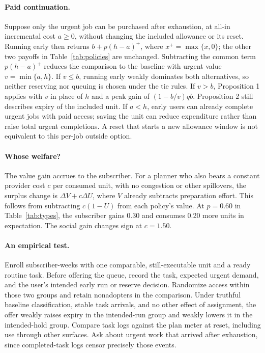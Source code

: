 \documentclass[11pt]{article}
\begin{document}
\paragraph{Paid continuation.}
Suppose only the urgent job can be purchased after exhaustion, at all-in incremental cost $a\geq0$, without changing the included allowance or its reset. Running early then returns $b+p(h-a)^+$, where $x^+=\max\{x,0\}$; the other two payoffs in Table~\ref{tab:policies} are unchanged. Subtracting the common term $p(h-a)^+$ reduces the comparison to the baseline with urgent value $v=\min\{a,h\}$. If $v\leq b$, running early weakly dominates both alternatives, so neither reserving nor queuing is chosen under the tie rules. If $v>b$, Proposition 1 applies with $v$ in place of $h$ and a peak gain of $(1-b/v)qb$. Proposition 2 still describes expiry of the included unit. If $a<h$, early users can already complete urgent jobs with paid access; saving the unit can reduce expenditure rather than raise total urgent completions. A reset that starts a new allowance window is not equivalent to this per-job outside option.

\paragraph{Whose welfare?}
The value gain accrues to the subscriber. For a planner who also bears a constant provider cost $c$ per consumed unit, with no congestion or other spillovers, the surplus change is $\Delta V+c\Delta U$, where $V$ already subtracts preparation effort. This follows from subtracting $c(1-U)$ from each policy's value. At $p=0.60$ in Table~\ref{tab:types}, the subscriber gains 0.30 and consumes 0.20 more units in expectation. The social gain changes sign at $c=1.50$.

\paragraph{An empirical test.}
Enroll subscriber-weeks with one comparable, still-executable unit and a ready routine task. Before offering the queue, record the task, expected urgent demand, and the user's intended early run or reserve decision. Randomize access within those two groups and retain nonadopters in the comparison. Under truthful baseline classification, stable task arrivals, and no other effect of assignment, the offer weakly raises expiry in the intended-run group and weakly lowers it in the intended-hold group. Compare task logs against the plan meter at reset, including use through other surfaces. Ask about urgent work that arrived after exhaustion, since completed-task logs censor precisely those events.
\end{document}
